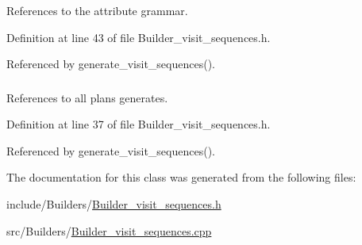 References to the attribute grammar. 



Definition at line 43 of file Builder\_\-visit\_\-sequences.h.

Referenced by generate\_\-visit\_\-sequences().\hypertarget{classgenevalmag_1_1Builder__visit__sequences_ccdb8c83f0540acd32f2ee461c9b2fbe}{
\subsubsection[{b\_\-plans}]{}}
\label{classgenevalmag_1_1Builder__visit__sequences_ccdb8c83f0540acd32f2ee461c9b2fbe}


References to all plans generates. 



Definition at line 37 of file Builder\_\-visit\_\-sequences.h.

Referenced by generate\_\-visit\_\-sequences().

The documentation for this class was generated from the following files:\begin{CompactItemize}
\item 
include/Builders/\hyperlink{Builder__visit__sequences_8h}{Builder\_\-visit\_\-sequences.h}\item 
src/Builders/\hyperlink{Builder__visit__sequences_8cpp}{Builder\_\-visit\_\-sequences.cpp}\end{CompactItemize}
